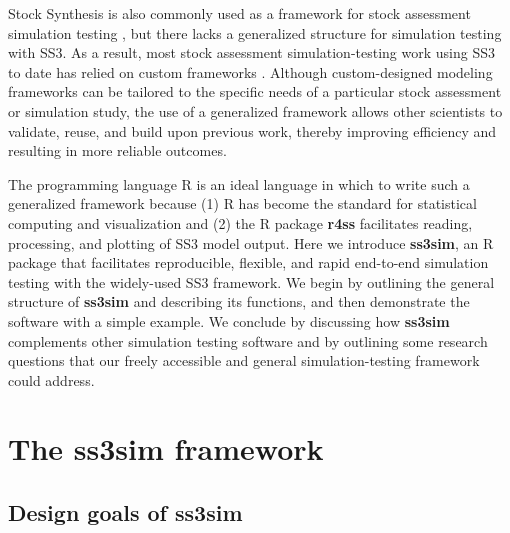 \documentclass[10pt]{article}
\begin{document}
Stock Synthesis is also commonly used as a framework for stock assessment
simulation testing \cite{helu2000, yin2004, schirripa2009, lee2011, jiao2012,
  lee2012, crone2013a, hurtadoferro2013}, but there lacks a generalized
structure for simulation testing with SS3. As a result, most stock
assessment simulation-testing work using SS3 to date has relied on custom
frameworks \cite{helu2000, yin2004, magnusson2007, wetzel2011a, jiao2012,
  wilberg2006, deroba2013, deroba2014, crone2013a, hurtadoferro2013}.
Although custom-designed modeling frameworks can be tailored to the
specific needs of a particular stock assessment or simulation study, the use of
a generalized framework allows other scientists to validate, reuse, and build
upon previous work, thereby improving efficiency and resulting in more reliable
outcomes.

The programming language \textsf{R} \cite{rcoreteam2013} is an ideal language
in which to write such a generalized framework because (1) \textsf{R} has
become the standard for statistical computing and visualization and (2) the
\textsf{R} package \textbf{r4ss} \cite{r4ss2013} facilitates reading,
processing, and plotting of SS3 model output. Here we introduce
\textbf{ss3sim}, an \textsf{R} package that facilitates reproducible,
flexible, and rapid end-to-end simulation testing with the widely-used SS3
framework. We begin by outlining the general structure of \textbf{ss3sim} and
describing its functions, and then demonstrate the software with a simple
example. We conclude by discussing how \textbf{ss3sim} complements other
simulation testing software and by outlining some research questions that our
freely accessible and general simulation-testing framework could address.

\section*{The ss3sim framework}

\subsection*{Design goals of ss3sim}
\end{document}
